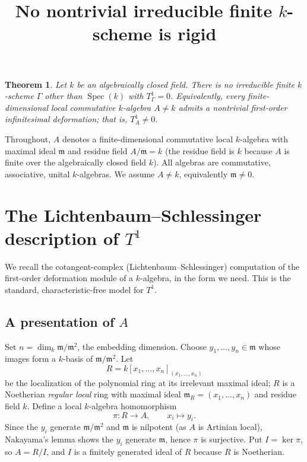 \documentclass{amsart}
\newtheorem{theorem}{Theorem}
\begin{document}
\title{No nontrivial irreducible finite $k$-scheme is rigid}
\maketitle

\begin{theorem}\label{thm:main}
Let $k$ be an algebraically closed field. There is \emph{no} irreducible finite
$k$-scheme $\Gamma$ other than $\operatorname{Spec}(k)$ with $T^1_\Gamma=0$.
Equivalently, every finite-dimensional local commutative $k$-algebra $A\neq k$
admits a nontrivial first-order infinitesimal deformation; that is, $T^1_A\neq 0$.
\end{theorem}

Throughout, $A$ denotes a finite-dimensional commutative local $k$-algebra with
maximal ideal $\mathfrak m$ and residue field $A/\mathfrak m=k$ (the residue field
is $k$ because $A$ is finite over the algebraically closed field $k$). All
algebras are commutative, associative, unital $k$-algebras. We assume $A\neq k$,
equivalently $\mathfrak m\neq 0$.

\section{The Lichtenbaum--Schlessinger description of $T^1$}

We recall the cotangent-complex (Lichtenbaum--Schlessinger) computation of the
first-order deformation module of a $k$-algebra, in the form we need. This is the
standard, characteristic-free model for $T^1$.

\subsection{A presentation of $A$}
Set $n=\dim_k \mathfrak m/\mathfrak m^2$, the embedding dimension. Choose
$y_1,\dots,y_n\in\mathfrak m$ whose images form a $k$-basis of
$\mathfrak m/\mathfrak m^2$. Let
\[
R=k[x_1,\dots,x_n]_{(x_1,\dots,x_n)}
\]
be the localization of the polynomial ring at its irrelevant maximal ideal; $R$
is a Noetherian \emph{regular local} ring with maximal ideal
$\mathfrak m_R=(x_1,\dots,x_n)$ and residue field $k$. Define a local
$k$-algebra homomorphism
\[
\pi\colon R\longrightarrow A,\qquad x_i\longmapsto y_i .
\]
Since the $y_i$ generate $\mathfrak m/\mathfrak m^2$ and $\mathfrak m$ is
nilpotent (as $A$ is Artinian local), Nakayama's lemma shows the $y_i$ generate
$\mathfrak m$, hence $\pi$ is surjective. Put $I=\ker\pi$, so $A=R/I$, and $I$ is
a finitely generated ideal of $R$ because $R$ is Noetherian.
\end{document}
